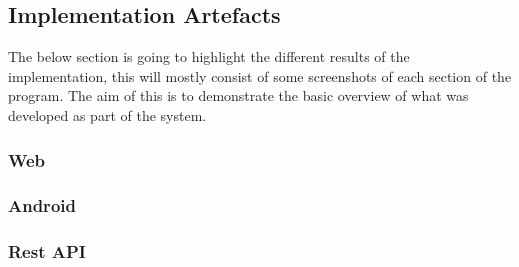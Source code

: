\subsection{Implementation Artefacts}
The below section is going to highlight the different results of the implementation, this will mostly consist of some screenshots of each section of the program. The aim of this is to demonstrate the basic overview of what was developed as part of the system.

\subsubsection{Web}
\subsubsection{Android}
\subsubsection{Rest API}


